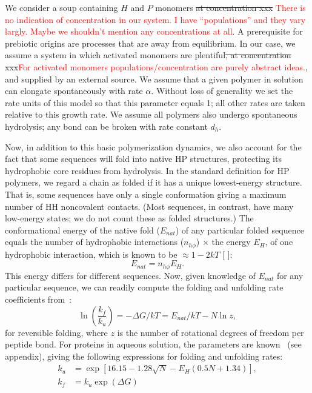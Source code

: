 \documentclass[journal=jacsat,manuscript=article,layout=twocolumn]{achemso}
\newcommand*{\ga}{\alpha}
\newcommand*{\gD}{\Delta}
\newcommand*{\pt}[1]{\left( #1\right)}
\newcommand*{\red}[1]{\textcolor{red}{#1}}
\begin{document}
 We consider a soup containing $H$ and $P$ monomers \sout{at concentration xxx} \red{There is no 
indication of concentration in our system. I have ``populations'' and they vary largly. Maybe we 
shouldn't mention any concentrations at all}.  
 A prerequisite for prebiotic origins are processes that are away from equilibrium.  In our case, 
we assume a system in which activated monomers are plentiful\sout{, at concentration 
xxx}\red{For activated monomers populations/concentration are purely abstract ideas.}, and 
supplied by 
an external source.  We assume that a given polymer in solution can elongate spontaneously with 
rate $\ga$.  Without loss of generality we set the rate units of this model so that this parameter 
equals 1; all other rates are taken relative to this growth rate.  We assume all polymers also 
undergo spontaneous hydrolysis; any bond can be broken with rate constant $d_h$.

 Now, in addition to this basic polymerization dynamics, we also account 
 for the fact that some sequences will fold into native HP structures, protecting its hydrophobic 
core residues from hydrolysis.  In the standard definition for HP polymers, we regard a chain as 
folded if it has a unique lowest-energy structure.  That is, some sequences have only a single 
conformation giving a maximum number of HH noncovalent contacts.  (Most sequences, in contrast, have 
many low-energy states; we do not count these as folded structures.)  The conformational energy of 
the native fold ($E_{nat}$) of any particular folded sequence equals the number of hydrophobic 
interactions ($n_{h\phi}$) $\times$ the energy $E_H$, of one hydrophobic interaction, which is known 
to be $\approx 1-2kT$ [  ]:
\begin{equation}
 E_{nat}=n_{h\phi}E_H.
\end{equation} 
This energy differs for different sequences.  Now, given knowledge of $E_{nat}$ for any particular 
sequence, we can readily compute the folding and unfolding rate coefficients from~\cite{Ghosh2009}:
\begin{equation}
 \ln\pt{\frac{k_f}{k_u}}=-\gD G/kT = E_{nat}/kT-N\ln z,
\end{equation} 
for reversible folding, where $z$ is the number of rotational degrees of freedom per peptide bond.  
For proteins in aqueous solution, the parameters are known~\cite{Ghosh2010,Dill2011} (see appendix), 
giving the following expressions for folding and unfolding rates:
\begin{equation}
\begin{split}
  k_u &= \exp[16.15-1.28 \sqrt{N} -E_H(0.5 N + 1.34)],\\
  k_f &= k_u\exp(\gD G)
\end{split}
\end{equation}
\end{document}
